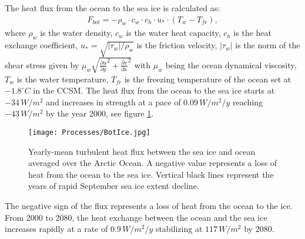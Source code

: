 The heat flux from the ocean to the sea ice is calculated as:
\begin{align}
F_{bot} = - \rho_w \cdot c_w \cdot c_h \cdot u_* \cdot (T_w - T_{fr}),
\end{align}
where $\rho_w$ is the water density, $c_w$ is the water heat capacity, $c_h$ is the heat exchange coefficient, $u_* = \sqrt{|\tau_w|/\rho_w}$ is the friction velocity, $|\tau_w|$ is the norm of the shear stress given by $\mu_w \sqrt{\frac{\partial u}{\partial y}^2+\frac{\partial v}{\partial x}^2}$ with $\mu_w$ being the ocean dynamical viscosity, $T_w$ is the water temperature, $T_{fr}$ is the freezing temperature of the ocean set at $-1.8^\circ C$ in the CCSM. The heat flux from the ocean to the sea ice starts at $-34\,W/m^2$ and increases in strength at a pace of $0.09\,W/m^2/y$ reaching $-43\,W/m^2$ by the year 2000, see figure \ref{foi}. 
\begin{figure}[t!]
\center
\noindent\texttt{[image: Processes/BotIce.jpg]}
\caption{Yearly-mean turbulent heat flux between the sea ice and ocean averaged over the Arctic Ocean. A negative value represents a loss of heat from the ocean to the sea ice. Vertical black lines represent the years of rapid September sea ice extent decline.}
\label{foi}
\end{figure}
The negative sign of the flux represents a loss of heat from the ocean to the ice. From 2000 to 2080, the heat exchange between the ocean and the sea ice increases rapidly at a rate of $0.9\,W/m^2/y$ stabilizing at $117\,W/m^2$ by 2080. 



